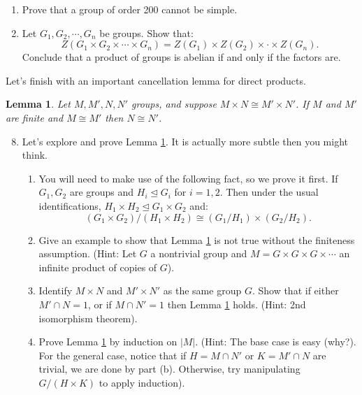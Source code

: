 \documentclass[11pt]{article}
\newtheorem{lemma}{Lemma}
\newcommand{\bF}{\mathbb{F}}
\begin{document}
\begin{enumerate}
{\begin{enumerate}
{    The subset of \textit{strictly upper triangular matrices} is:
    \[\overline T = \left\{\begin{pmatrix}1 & b\\0 & 1\end{pmatrix}\in GL_2(\bF_p)\right\}.\]
    Show that $T$ and $\overline T$ are subgroups of $GL_w(\bF_p)$.  We will see that they are not normal.
    }
    \item{
    Show that $\overline T$ is a Sylow $p$-subgroup of $GL_2(\bF_p)$ and of $T$.
    }
    \item{
    Show that $GL_2(\bF_p)$ has $p+1$ Sylow $p$-subgroups.
    }
    \item{
    Prove that $T$ is not normal in $GL_2(\bF_p)$.  (Hint: use Lemma \ref{LemmaA}).
    }
  \end{enumerate}
  }
  \item Prove that a group of order 200 cannot be simple.
  \item{
  Let $G_1,G_2,\cdots,G_n$ be groups.  Show that:
  \[Z(G_1\times G_2\times\cdots\times G_n) = Z(G_1)\times Z(G_2)\times\cdot\times Z(G_n).\]
  Conclude that a product of groups is abelian if and only if the factors are.
  }
\end{enumerate}
Let's finish with an important cancellation lemma for direct products.
\begin{lemma}\label{cancellation}
  Let $M,M',N,N'$ groups, and suppose $M\times N\cong M'\times N'$.  If $M$ and $M'$ are finite and $M\cong M'$ then $N\cong N'$.
\end{lemma}
\begin{enumerate}
  \setcounter{enumi}{7}
  \item{
  Let's explore and prove Lemma \ref{cancellation}.  It is actually more subtle then you might think.
  \begin{enumerate}
    \item{
    You will need to make use of the following fact, so we prove it first.  If $G_1,G_2$ are groups and $H_i\unlhd G_i$ for $i=1,2$.  Then under the usual identifications, $H_1\times H_2\unlhd G_1\times G_2$ and:
    \[(G_1\times G_2)/(H_1\times H_2)\cong(G_1/H_1)\times(G_2/H_2).\]
    }
    \item{
    Give an example to show that Lemma \ref{cancellation} is not true without the finiteness assumption.  (Hint: Let $G$ a nontrivial group and $M = G\times G\times G\times\cdots$ an infinite product of copies of $G$).
    }
    \item{
    Identify $M\times N$ and $M'\times N'$ as the same group $G$.  Show that if either  $M'\cap N = 1$, or if $M\cap N'=1$ then Lemma \ref{cancellation} holds.  (Hint: 2nd isomorphism theorem).
    }
    \item{
    Prove Lemma \ref{cancellation} by induction on $|M|$.  (Hint: The base case is easy (why?).  For the general case, notice that if $H = M\cap N'$ or $K = M'\cap N$ are trivial, we are done by part (b).  Otherwise, try manipulating $G/(H\times K)$ to apply induction).
    }
  \end{enumerate}
  }
\end{enumerate}
\end{document}
